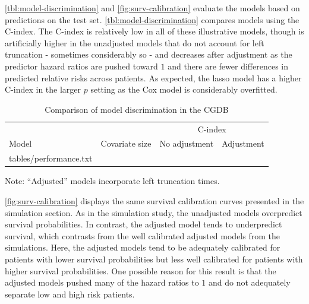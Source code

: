 \documentclass[11pt,final,fleqn]{article}\usepackage[]{graphicx}\usepackage[]{color}
\makeatletter
\theoremstyle{plain}
\newcommand*\ExpandableInput[1]{\@@input#1 }
\makeatother
\begin{document}
\autoref{tbl:model-discrimination}  and \autoref{fig:surv-calibration} evaluate the models based on predictions on the test set. \autoref{tbl:model-discrimination} compares models using the C-index. The C-index is relatively low in all of these illustrative models, though is artificially higher in the unadjusted models that do not account for left truncation - sometimes considerably so - and decreases after adjustment as the predictor hazard ratios are pushed toward $1$ and there are fewer differences in predicted relative risks across patients. As expected, the lasso model has a higher C-index in the larger $p$ setting as the Cox model is considerably overfitted.

\begin{table}[!ht]
\begin{center}
\begin{threeparttable}
\caption{Comparison of model discrimination in the CGDB} \label{tbl:model-discrimination}
\begin{tabularx}{\textwidth}{@{\extracolsep{\fill}}llrr}
\hline
\multicolumn{2}{l}{} & \multicolumn{2}{c}{C-index}  \\
\cmidrule(r){3-4}  
\multicolumn{1}{l}{Model} & \multicolumn{1}{l}{Covariate size} & \multicolumn{1}{l}{No adjustment} & \multicolumn{1}{l}{Adjustment}  \\
\hline
\ExpandableInput{tables/performance.txt}
\hline
\end{tabularx}
\scriptsize Note: ``Adjusted'' models incorporate left truncation times.
\end{threeparttable}
\end{center}
\end{table}

\autoref{fig:surv-calibration} displays the same survival calibration curves presented in the simulation section. As in the simulation study, the unadjusted models overpredict survival probabilities. In contrast, the adjusted model tends to underpredict survival, which contrasts from the well calibrated adjusted models from the simulations. Here, the adjusted models tend to be adequately calibrated for patients with lower survival probabilities but less well calibrated for patients with higher survival probabilities. One possible reason for this result is that the adjusted models pushed many of the hazard ratios to $1$ and do not adequately separate low and high risk patients.
\end{document}
